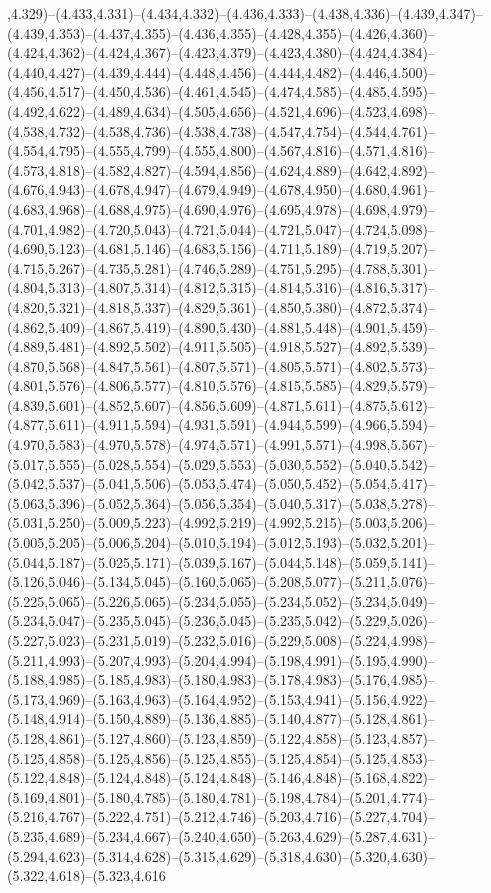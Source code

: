 ,4.329)--(4.433,4.331)--(4.434,4.332)--(4.436,4.333)--(4.438,4.336)--(4.439,4.347)--(4.439,4.353)--(4.437,4.355)--(4.436,4.355)--(4.428,4.355)--(4.426,4.360)--(4.424,4.362)--(4.424,4.367)--(4.423,4.379)--(4.423,4.380)--(4.424,4.384)--(4.440,4.427)--(4.439,4.444)--(4.448,4.456)--(4.444,4.482)--(4.446,4.500)--(4.456,4.517)--(4.450,4.536)--(4.461,4.545)--(4.474,4.585)--(4.485,4.595)--(4.492,4.622)--(4.489,4.634)--(4.505,4.656)--(4.521,4.696)--(4.523,4.698)--(4.538,4.732)--(4.538,4.736)--(4.538,4.738)--(4.547,4.754)--(4.544,4.761)--(4.554,4.795)--(4.555,4.799)--(4.555,4.800)--(4.567,4.816)--(4.571,4.816)--(4.573,4.818)--(4.582,4.827)--(4.594,4.856)--(4.624,4.889)--(4.642,4.892)--(4.676,4.943)--(4.678,4.947)--(4.679,4.949)--(4.678,4.950)--(4.680,4.961)--(4.683,4.968)--(4.688,4.975)--(4.690,4.976)--(4.695,4.978)--(4.698,4.979)--(4.701,4.982)--(4.720,5.043)--(4.721,5.044)--(4.721,5.047)--(4.724,5.098)--(4.690,5.123)--(4.681,5.146)--(4.683,5.156)--(4.711,5.189)--(4.719,5.207)--(4.715,5.267)--(4.735,5.281)--(4.746,5.289)--(4.751,5.295)--(4.788,5.301)--(4.804,5.313)--(4.807,5.314)--(4.812,5.315)--(4.814,5.316)--(4.816,5.317)--(4.820,5.321)--(4.818,5.337)--(4.829,5.361)--(4.850,5.380)--(4.872,5.374)--(4.862,5.409)--(4.867,5.419)--(4.890,5.430)--(4.881,5.448)--(4.901,5.459)--(4.889,5.481)--(4.892,5.502)--(4.911,5.505)--(4.918,5.527)--(4.892,5.539)--(4.870,5.568)--(4.847,5.561)--(4.807,5.571)--(4.805,5.571)--(4.802,5.573)--(4.801,5.576)--(4.806,5.577)--(4.810,5.576)--(4.815,5.585)--(4.829,5.579)--(4.839,5.601)--(4.852,5.607)--(4.856,5.609)--(4.871,5.611)--(4.875,5.612)--(4.877,5.611)--(4.911,5.594)--(4.931,5.591)--(4.944,5.599)--(4.966,5.594)--(4.970,5.583)--(4.970,5.578)--(4.974,5.571)--(4.991,5.571)--(4.998,5.567)--(5.017,5.555)--(5.028,5.554)--(5.029,5.553)--(5.030,5.552)--(5.040,5.542)--(5.042,5.537)--(5.041,5.506)--(5.053,5.474)--(5.050,5.452)--(5.054,5.417)--(5.063,5.396)--(5.052,5.364)--(5.056,5.354)--(5.040,5.317)--(5.038,5.278)--(5.031,5.250)--(5.009,5.223)--(4.992,5.219)--(4.992,5.215)--(5.003,5.206)--(5.005,5.205)--(5.006,5.204)--(5.010,5.194)--(5.012,5.193)--(5.032,5.201)--(5.044,5.187)--(5.025,5.171)--(5.039,5.167)--(5.044,5.148)--(5.059,5.141)--(5.126,5.046)--(5.134,5.045)--(5.160,5.065)--(5.208,5.077)--(5.211,5.076)--(5.225,5.065)--(5.226,5.065)--(5.234,5.055)--(5.234,5.052)--(5.234,5.049)--(5.234,5.047)--(5.235,5.045)--(5.236,5.045)--(5.235,5.042)--(5.229,5.026)--(5.227,5.023)--(5.231,5.019)--(5.232,5.016)--(5.229,5.008)--(5.224,4.998)--(5.211,4.993)--(5.207,4.993)--(5.204,4.994)--(5.198,4.991)--(5.195,4.990)--(5.188,4.985)--(5.185,4.983)--(5.180,4.983)--(5.178,4.983)--(5.176,4.985)--(5.173,4.969)--(5.163,4.963)--(5.164,4.952)--(5.153,4.941)--(5.156,4.922)--(5.148,4.914)--(5.150,4.889)--(5.136,4.885)--(5.140,4.877)--(5.128,4.861)--(5.128,4.861)--(5.127,4.860)--(5.123,4.859)--(5.122,4.858)--(5.123,4.857)--(5.125,4.858)--(5.125,4.856)--(5.125,4.855)--(5.125,4.854)--(5.125,4.853)--(5.122,4.848)--(5.124,4.848)--(5.124,4.848)--(5.146,4.848)--(5.168,4.822)--(5.169,4.801)--(5.180,4.785)--(5.180,4.781)--(5.198,4.784)--(5.201,4.774)--(5.216,4.767)--(5.222,4.751)--(5.212,4.746)--(5.203,4.716)--(5.227,4.704)--(5.235,4.689)--(5.234,4.667)--(5.240,4.650)--(5.263,4.629)--(5.287,4.631)--(5.294,4.623)--(5.314,4.628)--(5.315,4.629)--(5.318,4.630)--(5.320,4.630)--(5.322,4.618)--(5.323,4.616